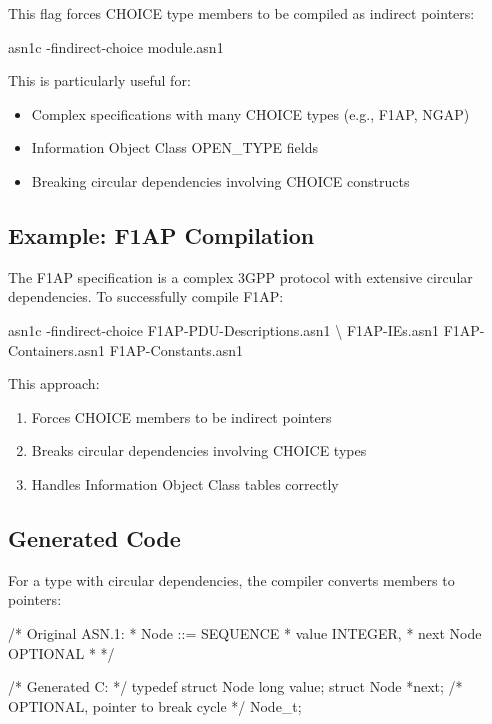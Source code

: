 \documentclass[english,oneside,12pt]{book}
\begin{document}
This flag forces CHOICE type members to be compiled as indirect pointers:

\begin{bash}
asn1c -findirect-choice module.asn1
\end{bash}

This is particularly useful for:
\begin{itemize}
\item Complex specifications with many CHOICE types (e.g., F1AP, NGAP)
\item Information Object Class OPEN\_TYPE fields
\item Breaking circular dependencies involving CHOICE constructs
\end{itemize}

\subsection*{Example: F1AP Compilation}

The F1AP specification is a complex 3GPP protocol with extensive circular dependencies. 
To successfully compile F1AP:

\begin{bash}
asn1c -findirect-choice F1AP-PDU-Descriptions.asn1 \textbackslash
      F1AP-IEs.asn1 F1AP-Containers.asn1 F1AP-Constants.asn1
\end{bash}

This approach:
\begin{enumerate}
\item Forces CHOICE members to be indirect pointers
\item Breaks circular dependencies involving CHOICE types
\item Handles Information Object Class tables correctly
\end{enumerate}

\subsection*{Generated Code}

For a type with circular dependencies, the compiler converts members to pointers:

\begin{example}
/* Original ASN.1:
 * Node ::= SEQUENCE {
 *     value   INTEGER,
 *     next    Node OPTIONAL
 * }
 */

/* Generated C: */
typedef struct Node {
    long      value;
    struct Node  *next;  /* OPTIONAL, pointer to break cycle */
} Node_t;
\end{example}
\end{document}
